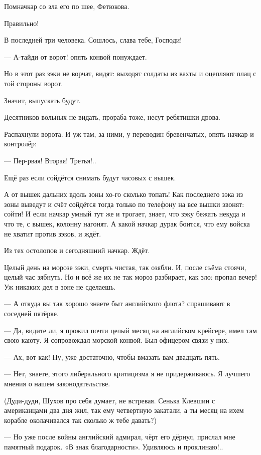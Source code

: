 Помначкар со зла его по шее, Фетюкова.

Правильно!

В последней \dash три человека. Сошлось, слава тебе, Господи!

--- А-тайди от ворот! \dash опять конвой понуждает.

Но в этот раз зэки не ворчат, видят: выходят солдаты из вахты и оцепляют плац с той стороны
ворот.

Значит, выпускать будут.

Десятников вольных не видать, прораба тоже, несут ребятишки дрова.

Распахнули ворота. И уж там, за ними, у переводин бревенчатых, опять начкар и контролёр:

--- Пер-рвая! Вторая! Третья!..

Ещё раз если сойдётся \dash снимать будут часовых с вышек.

А от вышек дальних вдоль зоны хо-го сколько топать! Как последнего зэка из зоны выведут и
счёт сойдётся \dash тогда только по телефону на все вышки звонят: сойти! И если начкар умный \dash
тут же и трогает, знает, что зэку бежать некуда и что те, с вышек, колонну нагонят. А какой
начкар дурак \dash боится, что ему войска не хватит против зэков, и ждёт.

Из тех остолопов и сегодняшний начкар. Ждёт.

Целый день на морозе зэки, смерть чистая, так озябли. И, после съёма стоячи, целый час зябнуть.
Но и всё же их не так мороз разбирает, как зло: пропал вечер! Уж никаких дел в зоне не сделаешь.

--- А откуда вы так хорошо знаете быт английского флота? \dash спрашивают в соседней пятёрке.

--- Да, видите ли, я прожил почти целый месяц на английском крейсере, имел там свою каюту. Я
сопровождал морской конвой. Был офицером связи у них.

--- Ах, вот как! Ну, уже достаточно, чтобы вмазать вам двадцать пять.

--- Нет, знаете, этого либерального критицизма я не придерживаюсь. Я лучшего мнения о нашем
законодательстве.

(Дуди-дуди, Шухов про себя думает, не встревая. Сенька Клевшин с американцами два дня жил, так
ему четвертную закатали, а ты месяц на ихем корабле околачивался \dash так сколько ж тебе
давать?)

--- Но уже после войны английский адмирал, чёрт его дёрнул, прислал мне памятный подарок. «В
знак благодарности». Удивляюсь и проклинаю!..

